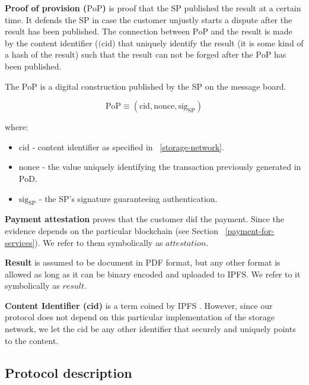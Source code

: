 \documentclass{ieeeaccess}
\begin{document}
\noindent \textbf
{Proof of provision ($\mathrm{PoP}$)}\label{proof-of-provision} is proof that the SP published the result at a certain time. It defends the SP in case the customer unjustly starts a dispute after the result has been published. The connection between $\mathrm{PoP}$ and the result is made by the content identifier ($(\mathrm{cid}$) that uniquely identify the result (it is some kind of a hash of the result) such that the result can not be forged after the $\mathrm{PoP}$ has been published.

The $\mathrm{PoP}$ is a digital construction published by the SP on the message board.

\[\mathrm{PoP} \equiv (\mathrm{cid}, \mathrm{nonce}, \mathrm{sig}_\mathrm{SP})\]

where:

\begin{itemize}

\item
  \(\mathrm{cid}\) - content identifier as specified in ~\ref{storage-network}.
\item
  \(\mathrm{nonce}\) - the value uniquely identifying the transaction previously generated in $\mathrm{PoD}$.
\item
  \(\mathrm{sig}_\mathrm{SP}\) - the SP's signature guaranteeing authentication.
\end{itemize}

\noindent \textbf
{Payment attestation}\label{payment-attestation}
proves that the customer did the payment. Since the
evidence depends on the particular blockchain (see Section ~\ref{payment-for-services}). We refer to them symbolically as
\(attestation\).

\noindent \textbf
{Result}\label{results} is assumed to be document in PDF format, but any other format is allowed as long as it can be binary encoded and uploaded to IPFS. We refer to it symbolically as $result$.

\noindent \textbf
{Content Identifier (cid)}\label{content-identifier-cid}  is a term coined by IPFS
\cite{Contenta59}  
. However, since our protocol does not depend on
this particular implementation of the storage network, we let the cid be any
other identifier that securely and uniquely points to the content.

\subsection{Protocol description}\label{protocol-description}
\end{document}
